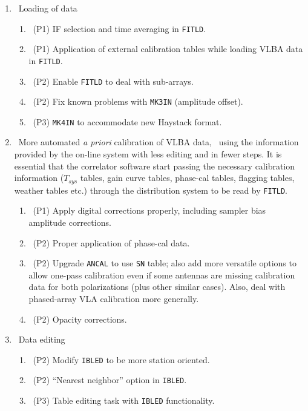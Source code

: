 \begin{enumerate}
\item\ Loading of data
   \begin{enumerate}
   \item\ (P1) IF selection and time averaging in \hbox{{\tt FITLD}}.
   \item\ (P1) Application of external calibration tables while loading
              VLBA data in \hbox{{\tt FITLD}}.
   \item\ (P2) Enable {\tt FITLD} to deal with sub-arrays.
   \item\ (P2) Fix known problems with {\tt MK3IN} (amplitude offset).
   \item\ (P3) {\tt MK4IN} to accommodate new Haystack format.
   \end{enumerate}
\item\ More automated {\it a priori} calibration of VLBA data, \ie\
      using the information provided by the on-line system with less
      editing and in fewer steps.  It is essential that the correlator
      software start passing the necessary calibration information
      ($T_{sys}$ tables, gain curve tables, phase-cal tables, flagging
      tables, weather tables etc.) through the distribution system to
      be read by \hbox{{\tt FITLD}}.
   \begin{enumerate}
   \item\ (P1) Apply digital corrections properly, including sampler
              bias amplitude corrections.
   \item\ (P2) Proper application of phase-cal data.
   \item\ (P2) Upgrade {\tt ANCAL} to use {\tt SN} table; also add more
              versatile options to allow one-pass calibration even if
              some antennas are missing calibration data for both
              polarizations (plus other similar cases).  Also, deal
              with phased-array VLA calibration more generally.
   \item\ (P2) Opacity corrections.
   \end{enumerate}
\vfill\eject
\item\ Data editing
   \begin{enumerate}
   \item\ (P2) Modify {\tt IBLED} to be more station oriented.
   \item\ (P2) ``Nearest neighbor'' option in \hbox{{\tt IBLED}}.
   \item\ (P3) Table editing task with {\tt IBLED} functionality.
   \end{enumerate}

\end{enumerate}
